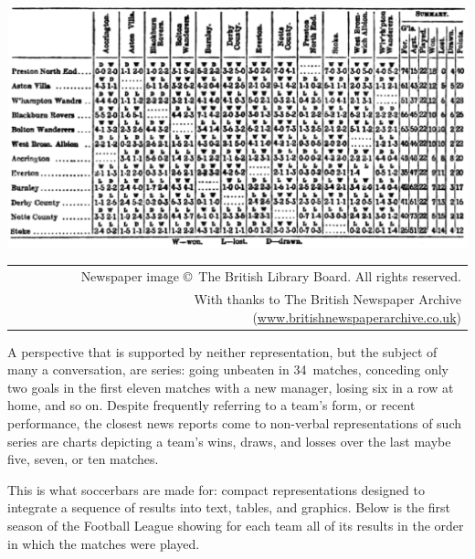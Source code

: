 \documentclass[a4paper,12pt]{ltxdoc}
\begin{document}
\begin{flushright}
\includegraphics[width=\linewidth]{fl1889_cff}
\scriptsize\quad\color{gray}\begin{tabular}{r@{}}
Newspaper image \copyright~The British Library Board. All rights reserved.\\
With thanks to The British Newspaper Archive (\url{www.britishnewspaperarchive.co.uk})
\end{tabular}
\end{flushright}

A perspective that is supported by neither representation, 
but the subject of many a conversation, are series:
going unbeaten in 34~matches,
conceding only two goals in the first eleven matches with a new manager,
losing six in a row at home, and so on. 
Despite frequently referring to a team's form, or recent performance,
the closest news reports come to non-verbal representations of such series 
are charts depicting a team's wins, draws, and losses
over the last maybe five, seven, or ten matches.

This is what soccerbars are made for: compact representations
designed to integrate a sequence of results into text, tables, and graphics.
Below is the first season of the Football League
showing for each team all of its results
in the order in which the matches were played. 
\end{document}
